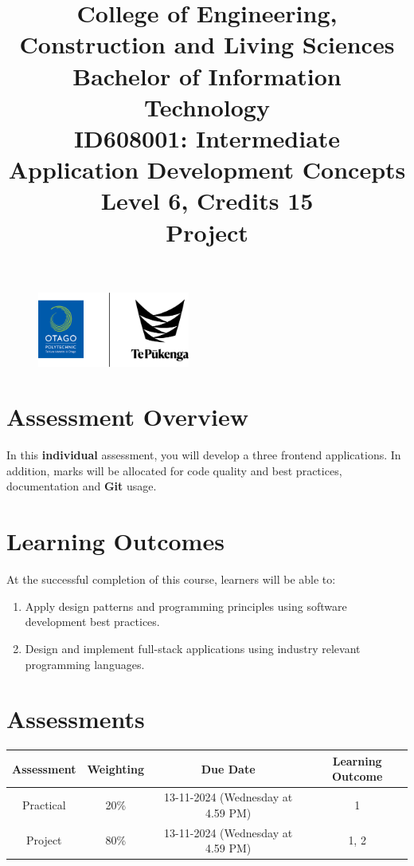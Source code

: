 \documentclass{article}
\author{}
\begin{document}
\begin{figure}
	\centering
	\includegraphics[width=50mm]{../../resources/img/logo.png}
\end{figure}

\title{College of Engineering, Construction and Living Sciences\\Bachelor of Information Technology\\ID608001: Intermediate Application Development Concepts\\Level 6, Credits 15\\\textbf{Project}}
\date{}
\maketitle 

\section*{Assessment Overview}
In this \textbf{individual} assessment, you will develop a three frontend applications. In addition, marks will be allocated for code quality and best practices, documentation and \textbf{Git} usage.

\section*{Learning Outcomes}
At the successful completion of this course, learners will be able to:
\begin{enumerate}
	\item Apply design patterns and programming principles using software development best practices.
	\item Design and implement full-stack applications using industry relevant programming languages.
\end{enumerate}

\section*{Assessments} 
\renewcommand{\arraystretch}{1.5}
\begin{tabular}{|c|c|c|c|}
	\hline 
	\textbf{Assessment}                                 & \textbf{Weighting} & \textbf{Due Date}            & \textbf{Learning Outcome} \\ \hline
	\small Practical & \small 20\%        & \small 13-11-2024 (Wednesday at 4.59 PM)   & \small 1                   \\ \hline
	\small Project                 & \small 80\%        & \small 13-11-2024 (Wednesday at 4.59 PM) \small  & \small 1, 2                   \\ \hline
\end{tabular}
\end{document}
